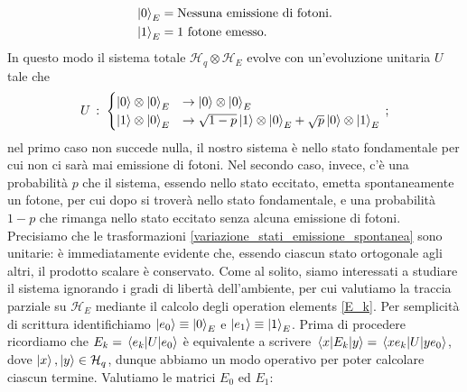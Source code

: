 \begin{align*}
    \ket{0}_E &= \text{Nessuna emissione di fotoni}. \\
    \ket{1}_E &= \text{1 fotone emesso}. 
\end{align*}
In questo modo il sistema totale $\mathcal{H}_q \otimes \mathcal{H}_E$ evolve con un'evoluzione unitaria $U$ tale che
\begin{equation}\label{variazione_stati_emissione_spontanea}
    U \, : \; 
    \begin{cases}
        \ket{0} \otimes \ket{0}_E &\rightarrow  \ket{0} \otimes \ket{0}_E \\
        \ket{1} \otimes \ket{0}_E &\rightarrow  \sqrt{1-p} \ket{1} \otimes \ket{0}_E + \sqrt{p} \ket{0} \otimes \ket{1}_E
    \end{cases} \, ;
\end{equation}
nel primo caso non succede nulla, il nostro sistema è nello stato fondamentale per cui non ci sarà mai emissione di fotoni. Nel secondo caso, invece, c'è una probabilità $p$ che il sistema, essendo nello stato eccitato, emetta spontaneamente un fotone, per cui dopo si troverà nello stato fondamentale, e una probabilità $1-p$ che rimanga nello stato eccitato senza alcuna emissione di fotoni. Precisiamo che le trasformazioni \eqref{variazione_stati_emissione_spontanea} sono unitarie: è immediatamente evidente che, essendo ciascun stato ortogonale agli altri, il prodotto scalare è conservato. Come al solito, siamo interessati a studiare il sistema ignorando i gradi di libertà dell'ambiente, per cui valutiamo la traccia parziale su $\mathcal{H}_E$ mediante il calcolo degli operation elements \eqref{E_k}. Per semplicità di scrittura identifichiamo $\ket{e_0} \equiv \ket{0}_E$ e $\ket{e_1} \equiv \ket{1}_E$. Prima di procedere ricordiamo che $E_k=\mel{e_k}{U}{e_0}$ è equivalente a scrivere $\mel{x}{E_k}{y}=\mel{xe_k}{U}{ye_0}$, dove $\ket x , \ket y \in \mathcal{H}_q$, dunque abbiamo un modo operativo per poter calcolare ciascun termine. Valutiamo le matrici $E_0$ ed $E_1$:
